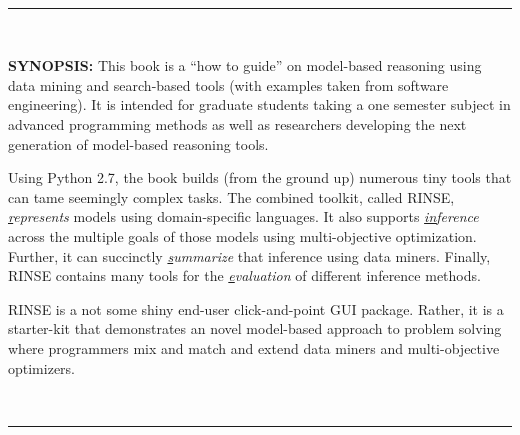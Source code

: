 \documentclass[9pt,twocolumn]{article}
\begin{document}
\begin{center}

 \begin{minipage}{.7\linewidth}
   ~\hrule~

   {\bf SYNOPSIS:} This book is a  ``how to guide'' on model-based reasoning using
   data mining and search-based tools (with examples taken from software engineering).
   It is intended for graduate  students taking
  a one semester subject in advanced programming methods as
  well as researchers developing the next generation
  of model-based reasoning tools.  

  \vspace{2mm}Using Python 2.7, the book builds (from the ground up) numerous
  tiny tools that can tame seemingly complex
  tasks. The combined toolkit, called RINSE, 
  {\em \underline{r}epresents}  models using domain-specific languages.  It also supports
    {\em \underline{in}ference} across the multiple goals of those models using multi-objective optimization.
    Further, it can 
    succinctly {\em \underline{s}ummarize} that inference  using data miners.
    Finally, RINSE contains many tools for the
   {\em \underline{e}valuation} of different inference methods. 

   \vspace{2mm}RINSE is a not some shiny  end-user click-and-point GUI package.
   Rather, it is a starter-kit that demonstrates an novel  model-based approach to problem solving where programmers
   mix and match and extend data miners and multi-objective optimizers.

  
  ~\hrule~
  
  \end{minipage}

  \end{center}
\thispagestyle{empty}
\clearpage
\small
\twocolumn



\fancyhead[LE,RO]{\slshape \rightmark}
\fancyhead[LO,RE]{\slshape \leftmark}

\tableofcontents

\vfill
\end{document}
